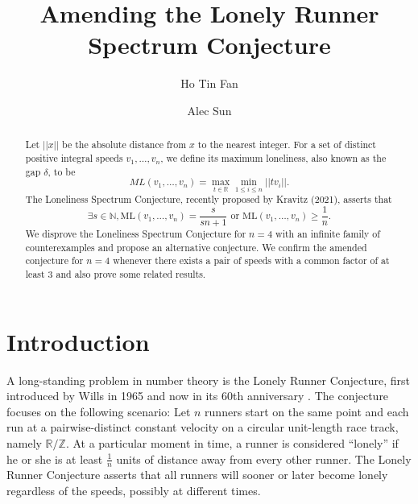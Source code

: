 \documentclass[11pt]{amsart}
\title{Amending the Lonely Runner Spectrum Conjecture}
\author{Ho Tin Fan}
\author{Alec Sun}
\begin{document}
\begin{abstract}
    Let $||x||$ be the absolute distance from $x$ to the nearest integer. For a set of distinct positive integral speeds $v_1, \ldots, v_n$, we define its maximum loneliness, also known as the gap $\delta$, to be
    $$ML(v_1,\ldots,v_n) = \max_{t \in \mathbb{R}}\min_{1 \leq i \leq n} || tv_i||.$$
    The Loneliness Spectrum Conjecture, recently proposed by Kravitz (2021), asserts that
    $$\exists s \in \mathbb{N}, \text{ML}(v_1,\ldots,v_n) = \frac{s} {sn + 1} \text{ or } \text{ML}(v_1,\ldots,v_n) \geq \frac{1}{n}.
    $$
    We disprove the Loneliness Spectrum Conjecture for $n = 4$ with an infinite family of counterexamples and propose an alternative conjecture. We confirm the amended conjecture for $n = 4$ whenever there exists a pair of speeds with a common factor of at least $3$ and also prove some related results.
\end{abstract}

\maketitle

\section{Introduction}

A long-standing problem in number theory is the Lonely Runner Conjecture, first introduced by Wills in 1965 \cite{willsthesis, wills} and now in its 60th anniversary \cite{perarnau}. The conjecture focuses on the following scenario: Let $n$ runners start on the same point and each run at a pairwise-distinct constant velocity on a circular unit-length race track, namely $\mathbb{R}/\mathbb{Z}$. At a particular moment in time, a runner is considered ``lonely'' if he or she is at least $\frac{1}{n}$ units of distance away from every other runner. The Lonely Runner Conjecture asserts that all runners will sooner or later become lonely regardless of the speeds, possibly at different times. 
\end{document}
